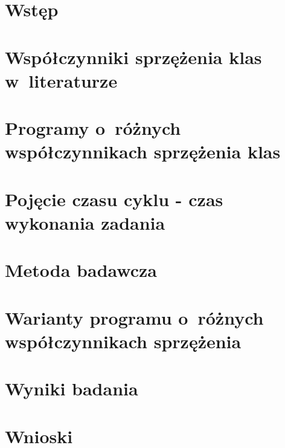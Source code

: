 \chapter{Wstęp}

\chapter{Współczynniki sprzężenia klas w~literaturze}

\chapter{Programy o~różnych współczynnikach sprzężenia klas}

\chapter{Pojęcie czasu cyklu - czas wykonania zadania}



\chapter{Metoda badawcza}



\chapter{Warianty programu o~różnych współczynnikach sprzężenia}

\chapter{Wyniki badania}

\chapter{Wnioski}
